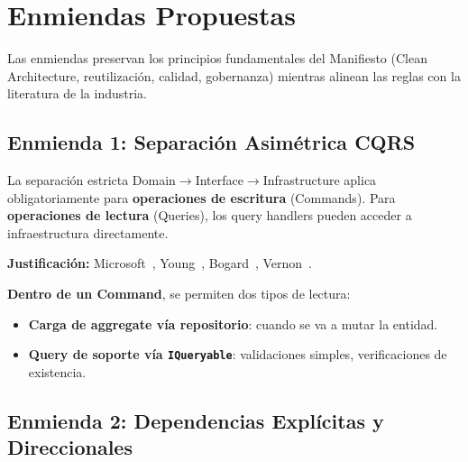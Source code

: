 \documentclass[conference]{IEEEtran}
\begin{document}
\section{Enmiendas Propuestas}
\label{sec:enmiendas}

Las enmiendas preservan los principios fundamentales del Manifiesto (Clean Architecture, reutilizaci\'on, calidad, gobernanza) mientras alinean las reglas con la literatura de la industria.

\subsection{Enmienda 1: Separaci\'on Asim\'etrica CQRS}

\begin{proposalbox}[Enmienda 1]
La separaci\'on estricta Domain$\to$Interface$\to$Infrastructure aplica obligatoriamente para \textbf{operaciones de escritura} (Commands). Para \textbf{operaciones de lectura} (Queries), los query handlers pueden acceder a infraestructura directamente.

\medskip
\textbf{Justificaci\'on:} Microsoft~\cite{microsoft2023}, Young~\cite{young2010}, Bogard~\cite{bogard2012}, Vernon~\cite{vernon2013}.

\medskip
\textbf{Dentro de un Command}, se permiten dos tipos de lectura:
\begin{itemize}[leftmargin=1.5em, itemsep=1pt]
    \item \textbf{Carga de aggregate v\'ia repositorio}: cuando se va a mutar la entidad.
    \item \textbf{Query de soporte v\'ia \texttt{IQueryable}}: validaciones simples, verificaciones de existencia.
\end{itemize}
\end{proposalbox}

\subsection{Enmienda 2: Dependencias Expl\'icitas y Direccionales}
\end{document}
